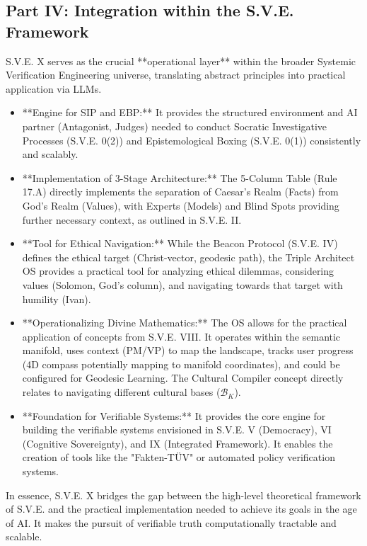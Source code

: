 \documentclass[11pt,a4paper]{article}
\theoremstyle{definition}
\theoremstyle{remark}
\begin{document}
\begin{itemize}
\begin{itemize}
\section{Part IV: Integration within the S.V.E. Framework}

S.V.E. X serves as the crucial **operational layer** within the broader Systemic Verification Engineering universe, translating abstract principles into practical application via LLMs.

\begin{itemize}
    \item **Engine for SIP and EBP:** It provides the structured environment and AI partner (Antagonist, Judges) needed to conduct Socratic Investigative Processes (S.V.E. 0(2)) and Epistemological Boxing (S.V.E. 0(1)) consistently and scalably.
    \item **Implementation of 3-Stage Architecture:** The 5-Column Table (Rule 17.A) directly implements the separation of Caesar's Realm (Facts) from God's Realm (Values), with Experts (Models) and Blind Spots providing further necessary context, as outlined in S.V.E. II.
    \item **Tool for Ethical Navigation:** While the Beacon Protocol (S.V.E. IV) defines the ethical target (Christ-vector, geodesic path), the Triple Architect OS provides a practical tool for analyzing ethical dilemmas, considering values (Solomon, God's column), and navigating towards that target with humility (Ivan).
    \item **Operationalizing Divine Mathematics:** The OS allows for the practical application of concepts from S.V.E. VIII. It operates within the semantic manifold, uses context (PM/VP) to map the landscape, tracks user progress (4D compass potentially mapping to manifold coordinates), and could be configured for Geodesic Learning. The Cultural Compiler concept directly relates to navigating different cultural bases ($\mathcal{B}_K$).
    \item **Foundation for Verifiable Systems:** It provides the core engine for building the verifiable systems envisioned in S.V.E. V (Democracy), VI (Cognitive Sovereignty), and IX (Integrated Framework). It enables the creation of tools like the "Fakten-TÜV" or automated policy verification systems.
\end{itemize}

In essence, S.V.E. X bridges the gap between the high-level theoretical framework of S.V.E. and the practical implementation needed to achieve its goals in the age of AI. It makes the pursuit of verifiable truth computationally tractable and scalable.


\end{itemize}
\end{itemize}
\end{document}

